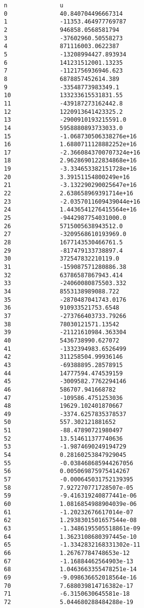 \documentclass[11pt]{article}
\begin{document}
\begin{Verbatim}[commandchars=\\\{\}]
n               u
0               40.840704496667314
1               -11353.464977769787
2               946858.0568581794
3               -37602960.50558273
4               871116003.0622387
5               -13208994427.893934
6               141231512001.13235
7               -1121756936946.623
8               6878857452614.389
9               -33548773983349.1
10              133233615531831.55
11              -439187273162442.8
12              1220913641423325.2
13              -2900910193215591.0
14              5958880893733033.0
15              -1.068730506338276e+16
16              1.6880711128882252e+16
17              -2.3660843700707324e+16
18              2.9628690122834868e+16
19              -3.334653382151728e+16
20              3.39151154800249e+16
21              -3.132290290025647e+16
22              2.638658969391714e+16
23              -2.0357011609439044e+16
24              1.4436541276415564e+16
25              -9442987754031000.0
26              5715005638943512.0
27              -3209568610193969.0
28              1677143530466761.5
29              -817479133738897.4
30              372547832210119.0
31              -159087571280886.38
32              63786587867943.414
33              -24060080875503.332
34              8553138989088.722
35              -2870487041743.0176
36              910933521753.6548
37              -273766403733.79266
38              78030121571.13542
39              -21121610984.363304
40              5436738990.627072
41              -1332394983.6526499
42              311258504.99936146
43              -69388895.28578915
44              14777594.474539159
45              -3009582.7762294146
46              586707.941668782
47              -109586.4751253036
48              19629.102401870667
49              -3374.6257835378537
50              557.302121881652
51              -88.47890721980497
52              13.514611377740636
53              -1.9874690249194729
54              0.28160253847929045
55              -0.038468685944267056
56              0.005069875975414267
57              -0.000645031752139395
58              7.927270771728507e-05
59              -9.416319240877441e-06
60              1.0816854988904039e-06
61              -1.20232676617014e-07
62              1.2938301501657544e-08
63              -1.3486195505518861e-09
64              1.3623108680397445e-10
65              -1.3342832168331302e-11
66              1.26767784748653e-12
67              -1.16884462564903e-13
68              1.0463663355478251e-14
69              -9.098636652018564e-16
70              7.688039814716382e-17
71              -6.3150630645581e-18
72              5.044680288484288e-19


\end{Verbatim}
\end{document}
